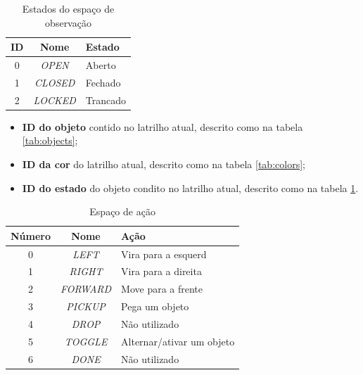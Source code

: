 \documentclass[9pt,a4paper,twoside]{tau}
\begin{document}
\begin{table}[htbp]
    \caption{Estados do espaço de observação}
    \label{tab:states}
    \centering
    \begin{tabular}{ccl}
        \toprule
        \textbf{ID} & \textbf{Nome}   & \textbf{Estado} \\
        \midrule
        0           & \textit{OPEN}   & Aberto          \\
        1           & \textit{CLOSED} & Fechado         \\
        2           & \textit{LOCKED} & Trancado        \\
        \bottomrule
    \end{tabular}
\end{table}

\begin{itemize}
    \item \textbf{ID do objeto} contido no latrilho atual, descrito como na tabela  \ref{tab:objects};
    \item \textbf{ID da cor} do latrilho atual, descrito como na tabela  \ref{tab:colors};
    \item \textbf{ID do estado} do objeto condito no latrilho atual, descrito como na tabela  \ref{tab:states}.
\end{itemize}

\begin{table}[htbp]
    \caption{Espaço de ação}
    \label{tab:actions}
    \centering
    \begin{tabular}{ccl}
        \toprule
        \textbf{Número} & \textbf{Nome}    & \textbf{Ação}             \\
        \midrule
        0               & \textit{LEFT}    & Vira para a esquerd       \\
        1               & \textit{RIGHT}   & Vira para a direita       \\
        2               & \textit{FORWARD} & Move para a frente        \\
        3               & \textit{PICKUP}  & Pega um objeto            \\
        4               & \textit{DROP}    & Não utilizado             \\
        5               & \textit{TOGGLE}  & Alternar/ativar um objeto \\
        6               & \textit{DONE}    & Não utilizado             \\
        \bottomrule
    \end{tabular}
\end{table}
\end{document}
